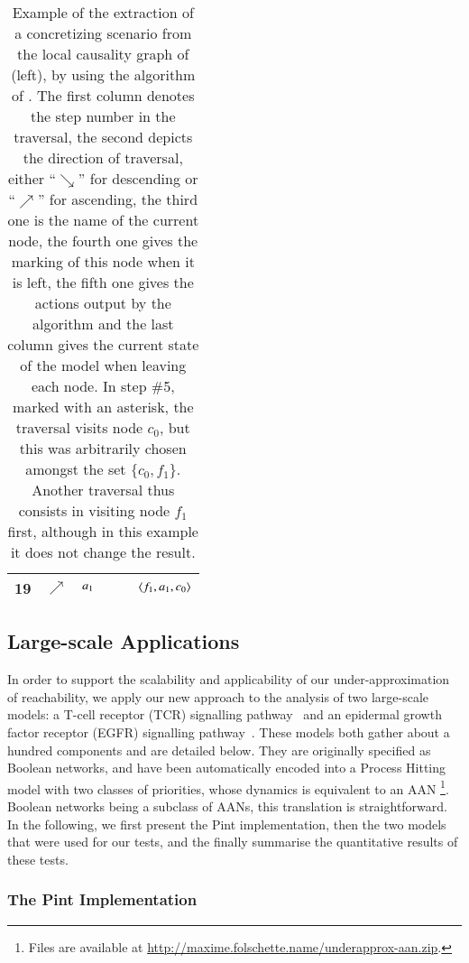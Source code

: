 \begin{table}[p]
\begin{tabular}{|c|c|c|l|l|l|}
    19 & $\nearrow$ & $a_1$ &  &  & $\mbox{$\langle f_1, a_1, c_0 \rangle$}$ \\\hline
  \end{tabular}
  \caption{\label{tab:concret-metazoan}%
    Example of the extraction of a concretizing scenario
    from the local causality graph of (left),
    by using the algorithm of .
    The first column denotes the step number in the traversal,
    the second depicts the direction of traversal,
    either “$\searrow$” for descending or “$\nearrow$” for ascending,
    the third one is the name of the current node,
    the fourth one gives the marking of this node when it is left,
    the fifth one gives the actions output by the algorithm
    and the last column gives the current state of the model when leaving each node.
    In step \#5, marked with an asterisk,
    the traversal visits node $c_0$, but this was arbitrarily chosen
    amongst the set $\{ c_0, f_1 \}$.
    Another traversal thus consists in visiting node $f_1$ first,
    although in this example it does not change the result.
  }
\end{table}



\subsection{Large-scale Applications}
\label{ssec:ex-tcrsig}

In order to support the scalability and applicability of our under-approximation of reachability, we
apply our new approach to the analysis of two large-scale models:
a T-cell receptor (TCR) signalling pathway~\cite{tcrsig94}
and an epidermal growth factor receptor (EGFR) signalling pathway~\cite{Samaga2009}.
These models both gather about a hundred components and are detailed below.
They are originally specified as Boolean networks,
and have been automatically encoded into
a Process Hitting model with two classes of priorities,
whose dynamics is equivalent to an AAN%
\footnote{Files are available at
\url{http://maxime.folschette.name/underapprox-aan.zip}. }.
Boolean networks being a subclass of AANs, this translation is straightforward.
In the following, we first present the Pint implementation,
then the two models that were used for our tests,
and the finally summarise the quantitative results of these tests.

\subsubsection*{The Pint Implementation}

